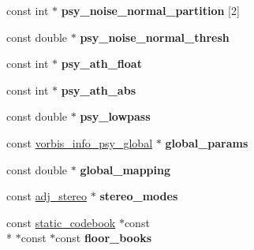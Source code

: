 \begin{DoxyCompactItemize}
\item 
\hypertarget{structve__setup__data__template_a12a6cccfe5870aef136c233391995404}{const int $\ast$ {\bfseries psy\+\_\+noise\+\_\+normal\+\_\+partition} \mbox{[}2\mbox{]}}\label{structve__setup__data__template_a12a6cccfe5870aef136c233391995404}

\item 
\hypertarget{structve__setup__data__template_a178d559e9a7fa8a6f66f4905fad95574}{const double $\ast$ {\bfseries psy\+\_\+noise\+\_\+normal\+\_\+thresh}}\label{structve__setup__data__template_a178d559e9a7fa8a6f66f4905fad95574}

\item 
\hypertarget{structve__setup__data__template_a1359dd7c84320f1350da647144689f87}{const int $\ast$ {\bfseries psy\+\_\+ath\+\_\+float}}\label{structve__setup__data__template_a1359dd7c84320f1350da647144689f87}

\item 
\hypertarget{structve__setup__data__template_a39b6e113004df487a5155c4d7b3faee5}{const int $\ast$ {\bfseries psy\+\_\+ath\+\_\+abs}}\label{structve__setup__data__template_a39b6e113004df487a5155c4d7b3faee5}

\item 
\hypertarget{structve__setup__data__template_ae8d4049ce7ae8ad4a8b6f739b80f56bd}{const double $\ast$ {\bfseries psy\+\_\+lowpass}}\label{structve__setup__data__template_ae8d4049ce7ae8ad4a8b6f739b80f56bd}

\item 
\hypertarget{structve__setup__data__template_af87eefec058f48e5772e249923a11b22}{const \hyperlink{structvorbis__info__psy__global}{vorbis\+\_\+info\+\_\+psy\+\_\+global} $\ast$ {\bfseries global\+\_\+params}}\label{structve__setup__data__template_af87eefec058f48e5772e249923a11b22}

\item 
\hypertarget{structve__setup__data__template_a19f141e94bc9fcdf1043e2ec1be15a4c}{const double $\ast$ {\bfseries global\+\_\+mapping}}\label{structve__setup__data__template_a19f141e94bc9fcdf1043e2ec1be15a4c}

\item 
\hypertarget{structve__setup__data__template_a70fda50f0f12a99eb1149f6ff3f4ae12}{const \hyperlink{structadj__stereo}{adj\+\_\+stereo} $\ast$ {\bfseries stereo\+\_\+modes}}\label{structve__setup__data__template_a70fda50f0f12a99eb1149f6ff3f4ae12}

\item 
\hypertarget{structve__setup__data__template_acdb6d67e5637a4c75a43ec70edc80d56}{const \hyperlink{structstatic__codebook}{static\+\_\+codebook} $\ast$const \\*
$\ast$const $\ast$const {\bfseries floor\+\_\+books}}\label{structve__setup__data__template_acdb6d67e5637a4c75a43ec70edc80d56}


\end{DoxyCompactItemize}
